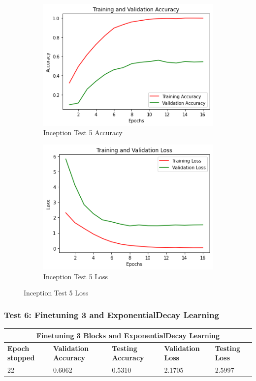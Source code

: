 \begin{figure}[H]
	\begin{subfigure}{0.5\textwidth}
		\includegraphics[width=0.9\linewidth]{img/inception/inceptionft3dropacc.png} 
		\caption{Inception Test 5 Accuracy}
		\label{fig:inceptionft3dropacc}
	\end{subfigure}
	\begin{subfigure}{0.5\textwidth}
		\includegraphics[width=0.9\linewidth]{img/inception/inceptionft3droploss.png}
		\caption{Inception Test 5 Loss}
		\label{fig:inceptionft3droploss}
	\end{subfigure}
\end{figure}

\subsubsection{Test 6: Finetuning 3 and ExponentialDecay Learning}
\begin{tabular}{ |p{2cm}|p{2cm}|p{2cm}|p{2cm}|p{2cm}|  }
\hline
\multicolumn{5}{|c|}{Finetuning 3 Blocks and ExponentialDecay Learning } \\
\hline
\textbf{Epoch stopped} & \textbf{Validation Accuracy} & \textbf{Testing Accuracy} & \textbf{Validation Loss} & \textbf{Testing Loss} \\
\hline
22 & 0.6062 & 0.5310 & 2.1705 & 2.5997\\
\hline
\end{tabular}

